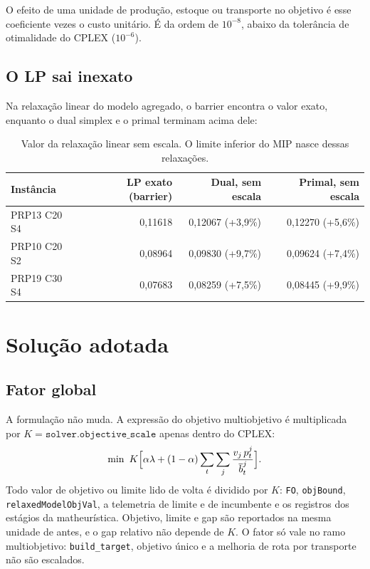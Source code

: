 \documentclass[11pt,a4paper]{article}
\newcommand{\tb}[1]{\overline{b}_{#1}}
\begin{document}
O efeito de uma unidade de produção, estoque ou transporte no objetivo é esse
coeficiente vezes o custo unitário. É da ordem de $10^{-8}$, abaixo da
tolerância de otimalidade do CPLEX ($10^{-6}$).

\subsection{O LP sai inexato}

Na relaxação linear do modelo agregado, o barrier encontra o valor exato,
enquanto o dual simplex e o primal terminam acima dele:

\begin{table}[h]
  \centering
  \begin{tabular}{lrrr}
    \toprule
    Instância & LP exato (barrier) & Dual, sem escala & Primal, sem escala\\
    \midrule
    PRP13 C20 S4 & 0{,}11618 & 0{,}12067 (+3{,}9\%) & 0{,}12270 (+5{,}6\%)\\
    PRP10 C20 S2 & 0{,}08964 & 0{,}09830 (+9{,}7\%) & 0{,}09624 (+7{,}4\%)\\
    PRP19 C30 S4 & 0{,}07683 & 0{,}08259 (+7{,}5\%) & 0{,}08445 (+9{,}9\%)\\
    \bottomrule
  \end{tabular}
  \caption{Valor da relaxação linear sem escala. O limite inferior do MIP nasce
  dessas relaxações.}
\end{table}

\section{Solução adotada}

\subsection{Fator global}

A formulação não muda. A expressão do objetivo multiobjetivo é multiplicada por
$K=\texttt{solver.objective\_scale}$ apenas dentro do CPLEX:
\begin{equation}
  \min\ K\Bigl[\alpha\lambda+(1-\alpha)\sum_{t}\sum_{j}\frac{v_j\,p_t^j}{\tb{t}^j}\Bigr].
\end{equation}
Todo valor de objetivo ou limite lido de volta é dividido por $K$: \texttt{FO},
\texttt{objBound}, \texttt{relaxedModelObjVal}, a telemetria de limite e de
incumbente e os registros dos estágios da matheurística. Objetivo, limite e
gap são reportados na mesma unidade de antes, e o gap relativo não depende de
$K$. O fator só vale no ramo multiobjetivo: \texttt{build\_target}, objetivo
único e a melhoria de rota por transporte não são escalados.
\end{document}
